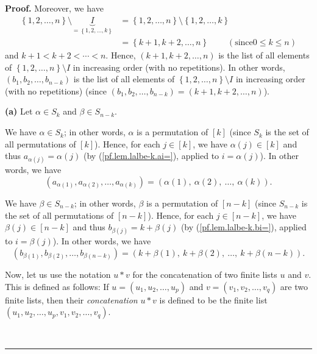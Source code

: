 \documentclass
[numbers=enddot,12pt,final,onecolumn,notitlepage,english]{scrartcl}%
\theoremstyle{definition}
\newenvironment{proof}[1][Proof]{\noindent\textbf{#1.} }{\ \rule{0.5em}{0.5em}}
\newenvironment{verlong}{}{}
\begin{document}
\begin{verlong}
\begin{proof}
Moreover, we have%
\begin{align*}
\left\{  1,2,\ldots,n\right\}  \setminus\underbrace{I}_{=\left\{
1,2,\ldots,k\right\}  }  &  =\left\{  1,2,\ldots,n\right\}  \setminus\left\{
1,2,\ldots,k\right\} \\
&  =\left\{  k+1,k+2,\ldots,n\right\}  \ \ \ \ \ \ \ \ \ \ \left(  \text{since
}0\leq k\leq n\right)
\end{align*}
and $k+1<k+2<\cdots<n$. Hence, $\left(  k+1,k+2,\ldots,n\right)  $ is the list
of all elements of $\left\{  1,2,\ldots,n\right\}  \setminus I$ in increasing
order (with no repetitions). In other words, $\left(  b_{1},b_{2}%
,\ldots,b_{n-k}\right)  $ is the list of all elements of $\left\{
1,2,\ldots,n\right\}  \setminus I$ in increasing order (with no repetitions)
(since $\left(  b_{1},b_{2},\ldots,b_{n-k}\right)  =\left(  k+1,k+2,\ldots
,n\right)  $). \medskip

\textbf{(a)} Let $\alpha\in S_{k}$ and $\beta\in S_{n-k}$.

We have $\alpha\in S_{k}$; in other words, $\alpha$ is a permutation of
$\left[  k\right]  $ (since $S_{k}$ is the set of all permutations of $\left[
k\right]  $). Hence, for each $j\in\left[  k\right]  $, we have $\alpha\left(
j\right)  \in\left[  k\right]  $ and thus $a_{\alpha\left(  j\right)  }%
=\alpha\left(  j\right)  $ (by (\ref{pf.lem.lalbe-k.ai=}), applied to
$i=\alpha\left(  j\right)  $). In other words, we have%
\[
\left(  a_{\alpha\left(  1\right)  },a_{\alpha\left(  2\right)  }%
,\ldots,a_{\alpha\left(  k\right)  }\right)  =\left(  \alpha\left(  1\right)
,\ \alpha\left(  2\right)  ,\ \ldots,\ \alpha\left(  k\right)  \right)  .
\]


We have $\beta\in S_{n-k}$; in other words, $\beta$ is a permutation of
$\left[  n-k\right]  $ (since $S_{n-k}$ is the set of all permutations of
$\left[  n-k\right]  $). Hence, for each $j\in\left[  n-k\right]  $, we have
$\beta\left(  j\right)  \in\left[  n-k\right]  $ and thus $b_{\beta\left(
j\right)  }=k+\beta\left(  j\right)  $ (by (\ref{pf.lem.lalbe-k.bi=}), applied
to $i=\beta\left(  j\right)  $). In other words, we have%
\[
\left(  b_{\beta\left(  1\right)  },b_{\beta\left(  2\right)  },\ldots
,b_{\beta\left(  n-k\right)  }\right)  =\left(  k+\beta\left(  1\right)
,\ k+\beta\left(  2\right)  ,\ \ldots,\ k+\beta\left(  n-k\right)  \right)  .
\]


Now, let us use the notation $u\ast v$ for the concatenation of two finite
lists $u$ and $v$. This is defined as follows: If $u=\left(  u_{1}%
,u_{2},\ldots,u_{p}\right)  $ and $v=\left(  v_{1},v_{2},\ldots,v_{q}\right)
$ are two finite lists, then their \emph{concatenation} $u\ast v$ is defined
to be the finite list $\left(  u_{1},u_{2},\ldots,u_{p},v_{1},v_{2}%
,\ldots,v_{q}\right)  $.


\end{proof}
\end{verlong}
\end{document}
